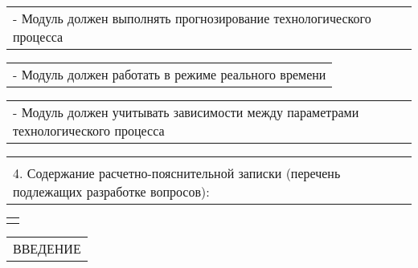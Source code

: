 \documentclass[12pt, А4, twoside]{article}
\begin{document}
\begin{FlushLeft}
    \vspace{-0.1 cm}

    \begin{tabular}{p{17.25cm}}
        \hspace{0.6cm} \textsf{- Модуль должен выполнять прогнозирование технологического процесса}\vspace{0pt} \hline \\
    \end{tabular}

    \vspace{-0.1 cm}

    \begin{tabular}{p{17.25cm}}
        \hspace{0.6cm} \textsf{- Модуль должен работать в режиме реального времени}\vspace{0pt} \hline 
    \end{tabular}

    \vspace{-0.1 cm}

    \begin{tabular}{p{17.25cm}}
        \hspace{0.6cm} \textsf{- Модуль должен учитывать зависимости между параметрами технологического процесса}\vspace{0pt} \hline 
    \end{tabular}

    \vspace{-0.1 cm}

    \begin{tabular}{p{17.25cm}}
        \vspace{0.1cm} \hline \\
        \textsf{4. Содержание расчетно-пояснительной записки (перечень подлежащих разработке вопросов):} \vspace{0pt} \hline \\
    \end{tabular}

    \begin{tabular}{p{17.25cm}}
        \vspace{0pt} \hline \\
    \end{tabular}

    \vspace{-0.1 cm}

    \begin{tabular}{p{17.25cm}}
        \hspace{0.3cm} \textsf{ВВЕДЕНИЕ} \vspace{0pt} \hline \\
    \end{tabular}


\end{FlushLeft}
\end{document}
